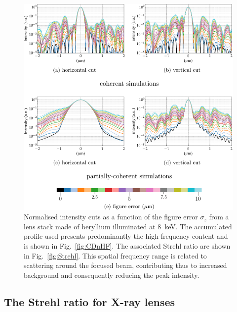 \begin{refsection}
\begin{figure}[t]
    \centering
    \includegraphics[width=0.7\linewidth]{figures/ch05/hf_strehl_scan.pdf} %
    \caption[Normalised intensity cut for $\sigma_z$ scan]{Normalised intensity cuts as a function of the figure error $\sigma_z$ from a lens stack made of beryllium illuminated at 8~keV. The accumulated profile used presents predominantly the high-frequency content and is shown in Fig.~\ref{fig:CDnHF}. The associated Strehl ratio are shown in Fig.~\ref{fig:Strehl}. This spatial frequency range is related to scattering around the focused beam, contributing thus to increased background and consequently reducing the peak intensity.}
    \label{fig:hf_strehl_scan}
\end{figure}{}

\subsection{The Strehl ratio for X-ray lenses}\label{section:discussion_strehl}


\end{refsection}

